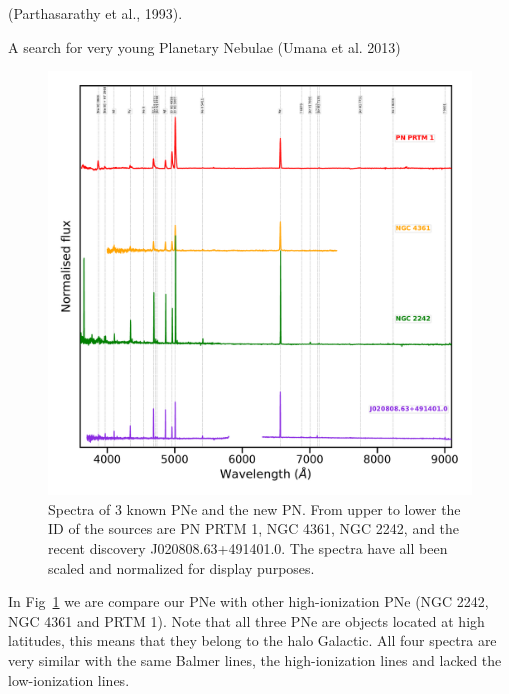 \documentclass[fleqn,usenatbib]{mnras}
\begin{document}
(Parthasarathy et al., 1993). {\cs A search for very young
  Planetary Nebulae (Umana et al. 2013)

\begin{figure}
\centering
\includegraphics[width=\linewidth]{Figs/spectra-compare.pdf}
\caption{Spectra of 3 known PNe and the new PN. From upper to lower the ID of the
  sources are PN PRTM 1, NGC 4361, NGC 2242, and the recent discovery
  J020808.63+491401.0. The spectra have all been scaled and normalized
  for display purposes.} 
  \label{fig:compare-spectra}
\end{figure}

In Fig~\ref{fig:compare-spectra} we are compare our PNe with
other high-ionization PNe (NGC 2242, NGC 4361 and PRTM 1).
Note that all three PNe are objects located at high latitudes,
this means that they belong to the halo Galactic.
All four spectra are very similar with the same Balmer lines,
the high-ionization lines and lacked the low-ionization lines.

}
\end{document}
